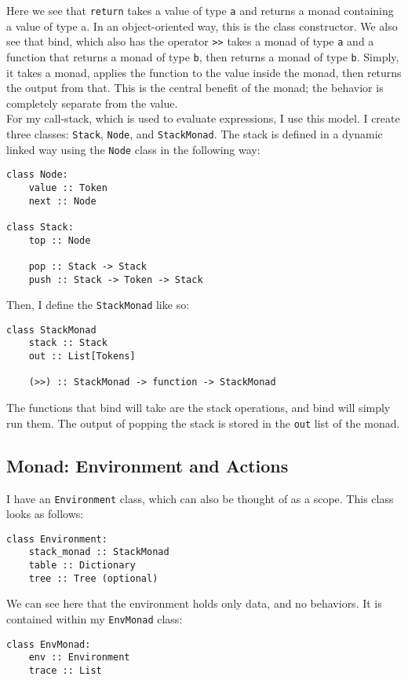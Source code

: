 \documentclass[a4paper, 11pt]{report}
\begin{document}
{{Here we see that \verb|return| takes a value of type \verb|a| and returns a monad containing a value of type a. In an object-oriented way, this is the class constructor. We also see that bind, which also has the operator \verb|>>| takes a monad of type \verb|a| and a function that returns a monad of type \verb|b|, then returns a monad of type \verb|b|. Simply, it takes a monad, applies the function to the value inside the monad, then returns the output from that. This is the central benefit of the monad; the behavior is completely separate from the value.\\

For my call-stack, which is used to evaluate expressions, I use this model. I create three classes: \verb|Stack|, \verb|Node|, and \verb|StackMonad|. The stack is defined in a dynamic linked way using the \verb|Node| class in the following way:
\begin{verbatim}
class Node:
    value :: Token
    next :: Node

class Stack:
    top :: Node
    
    pop :: Stack -> Stack
    push :: Stack -> Token -> Stack
\end{verbatim}

Then, I define the \verb|StackMonad| like so:
\begin{verbatim}
class StackMonad
    stack :: Stack
    out :: List[Tokens]
    
    (>>) :: StackMonad -> function -> StackMonad
\end{verbatim}

The functions that bind will take are the stack operations, and bind will simply run them. The output of popping the stack is stored in the \verb|out| list of the monad.\\
\subsection{Monad: Environment and Actions}\label{sec:monad-environment-and-actions}
I have an \verb|Environment| class, which can also be thought of as a scope. This class looks as follows:
\begin{verbatim}
class Environment:
    stack_monad :: StackMonad
    table :: Dictionary
    tree :: Tree (optional)
\end{verbatim}

We can see here that the environment holds only data, and no behaviors. It is contained within my \verb|EnvMonad| class:
\begin{verbatim}
class EnvMonad:
    env :: Environment
    trace :: List
    

\end{verbatim}}}
\end{document}
